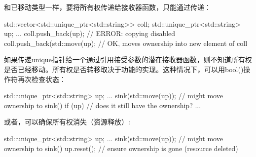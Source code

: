 和已移动类型一样，要将所有权传递给接收器函数，只能通过传递：

\begin{cppcode}
std::vector<std::unique_ptr<std::string>> coll;
std::unique_ptr<std::string> up;
...
coll.push_back(up); // ERROR: copying disabled
coll.push_back(std::move(up); // OK, moves ownership into new element of coll
\end{cppcode}

如果传递unique指针给一个通过引用接受参数的潜在接收器函数，则不知道所有权是否已经移动。所有权是否转移取决于功能的实现。这种情况下，可以用bool()操作符再次检查状态：

\begin{cppcode}
std::unique_ptr<std::string> up;
...
sink(std::move(up)); // might move ownership to sink()
if (up) { // does it still have the ownership?
	...
}
\end{cppcode}

或者，可以确保所有权消失（资源释放）:

\begin{cppcode}
std::unique_ptr<std::string> up;
...
sink(std::move(up)); // might move ownership to sink()
up.reset(); // ensure ownership is gone (resource deleted)
\end{cppcode}













